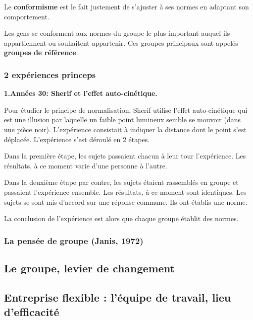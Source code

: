 \documentclass[12pt]{article}
\begin{document}
		 Le \textbf{conformisme} est le fait justement de s'ajuster à ses normes en adaptant son comportement. \newline
		 
		 Les gens se conforment aux normes du groupe le plus important auquel ils appartiennent ou souhaitent appartenir. Ces groupes principaux sont appelés \textbf{groupes de référence}.
		 
		 \subsubsection*{2 expériences princeps}
		 
		 \textbf{1.Années 30: Sherif et l'effet auto-cinétique.} \newline
		 
		 Pour étudier le principe de normalisation, Sherif utilise l'effet auto-cinétique qui est une illusion par laquelle un faible point lumineux semble se mouvoir (dans une pièce noir).  L'expérience consistait à indiquer la distance dont le point s'est déplacée. L'expérience s'est déroulé en 2 étapes. \newline
		 
		 Dans la première étape, les sujets passaient chacun à leur tour l'expérience. Les résultats, à ce moment varie d'une personne à l'autre. \newline
		 
		 Dans la deuxième étape par contre, les sujets étaient rassemblés en groupe et passaient l'expérience ensemble.  Les résultats, à ce moment sont identiques. Les sujets se sont mis d'accord sur une réponse commune. Ils ont établis une norme. \newline
		 
		 La conclusion de l'expérience est alors que chaque groupe établit des normes. \newline
		 
		 
		 
				
		\subsubsection{La pensée de groupe (Janis, 1972)}
	\subsection{Le groupe, levier de changement}
	\subsection{Entreprise flexible : l’équipe de travail, lieu d’efficacité}
\end{document}
